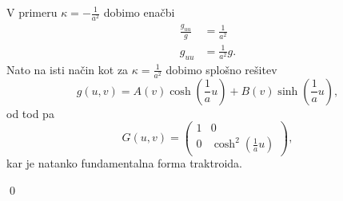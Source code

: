 \begin{enumerate}
V primeru $\kappa = - \frac{1}{a^2}$ dobimo enačbi 
\begin{align*}
    \frac{g_{uu}}{g} &= \frac{1}{a^2}  \\
    g_{uu} &= \frac{1}{a^2} g.
\end{align*}
Nato na isti način kot za $\kappa = \frac{1}{a^2}$ dobimo splošno rešitev \begin{equation*}
g(u,v) = A(v) \cosh ( \frac{1}{a}  u) + B(v) \sinh (\frac{1}{a} u),
\end{equation*}  
od tod pa \begin{equation*}
G(u,v) = \begin{pmatrix}
1 & 0 \\
0 & \cosh^2 (\frac{1}{a} u)
\end{pmatrix},
\end{equation*}  
kar je natanko fundamentalna forma traktroida.
\end{enumerate}




\qed
